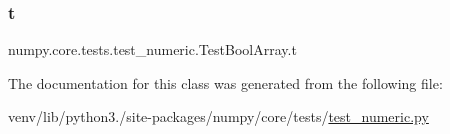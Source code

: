 \mbox{\label{classnumpy_1_1core_1_1tests_1_1test__numeric_1_1TestBoolArray_a420fd674b400dc3bc6df929d96c0ccbd}} 
\subsubsection{\texorpdfstring{t}{t}}
{\footnotesize\ttfamily numpy.\+core.\+tests.\+test\+\_\+numeric.\+Test\+Bool\+Array.\+t}



The documentation for this class was generated from the following file\+:\begin{DoxyCompactItemize}
\item 
venv/lib/python3./site-\/packages/numpy/core/tests/\hyperlink{core_2tests_2test__numeric_8py}{test\+\_\+numeric.\+py}\end{DoxyCompactItemize}
